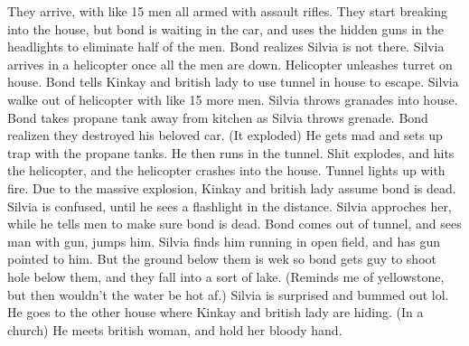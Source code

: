 \documentclass{article}
\begin{document}
    They arrive, with like 15 men all armed with assault rifles. They start breaking into the house,
    but bond is waiting in the  car, and uses the hidden guns in the headlights to eliminate half of the men.
    Bond realizes Silvia is not there. Silvia arrives in a helicopter once all the men
    are down. Helicopter unleashes turret on house. Bond tells Kinkay and british lady to use
    tunnel in house to escape. Silvia walke out of helicopter with like 15 more men.
    Silvia throws granades into house. Bond takes propane tank away from kitchen as Silvia throws grenade.
    Bond realizen they destroyed his beloved car. (It exploded) He gets mad and sets up trap with the propane tanks. He then runs in the tunnel.
    Shit explodes, and hits the helicopter, and the helicopter crashes into the house.
    Tunnel lights up with fire. Due to the massive explosion, Kinkay and british lady assume bond is dead.
    Silvia is confused, until he sees a flashlight in the distance. Silvia approches her, while he tells men to
    make sure bond is dead. Bond comes out of tunnel, and sees man with gun, jumps him. Silvia finds him running in
    open field, and has gun pointed to him. But the ground below them is wek so bond gets guy to shoot hole below them,
    and they fall into a sort of lake. (Reminds me of yellowstone, but then wouldn't the water be hot af.)
    Silvia is surprised and bummed out lol. He goes to the other house where Kinkay and british lady are hiding. (In a church)
    He meets british woman, and hold her bloody hand. 
\end{document}
